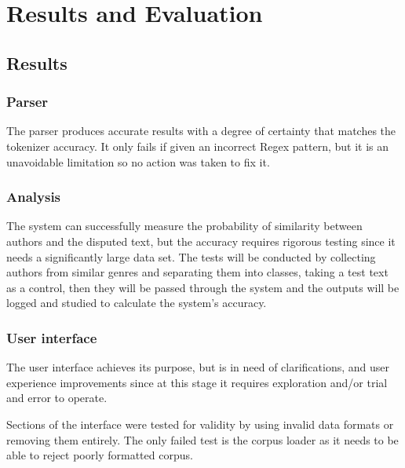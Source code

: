 \chapter{Results and Evaluation}

\section{Results}
\subsection{Parser}
The parser produces accurate results with a degree of certainty that matches the tokenizer accuracy. It only fails if given an incorrect Regex pattern, but it is an unavoidable limitation so no action was taken to fix it.

\subsection{Analysis}
The system can successfully measure the probability of similarity between authors and the disputed text, but the accuracy requires rigorous testing since it needs a significantly large data set. The tests will be conducted by collecting authors from similar genres and separating them into classes, taking a test text as a control, then they will be passed through the system and the outputs will be logged and studied to calculate the system's accuracy.

\subsection{User interface}
The user interface achieves its purpose, but is in need of clarifications, and user experience improvements since at this stage it requires exploration and/or trial and error to operate.

Sections of the interface were tested for validity by using invalid data formats or removing them entirely. The only failed test is the corpus loader as it needs to be able to reject poorly formatted corpus.
